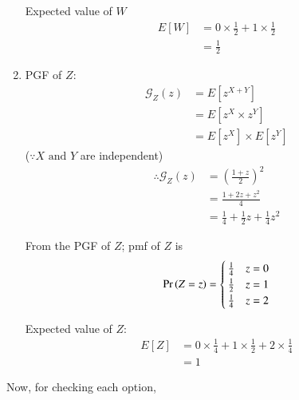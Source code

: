 \documentclass[journal,12pt,twocolumn]{IEEEtran}
\begin{document}
\begin{enumerate}
Expected value of $W$
\begin{align}
   E[W] &= 0\times\frac{1}{2} + 1\times\frac{1}{2}\\
                    &= \frac{1}{2} 
\end{align}

  \item PGF of $Z$:
\begin{align}
  \mathcal{G}_Z(z) &= E[z^{X+Y}]\\
                   &= E[z^X \times z^Y]\\
                   &= E[z^X]\times E[z^Y] 
\end{align}
($\because X \text{ and } Y$ are independent)
\begin{align}
 \therefore \mathcal{G}_Z(z) &=\left(\frac{1 + z}{2}\right)^2\\
                   &= \frac{1+2z+z^2}{4}\\
                   &= \frac{1}{4} + \frac{1}{2}z + \frac{1}{4}z^2
\end{align}

From the PGF of $Z$; \;pmf of $Z$ is
\begin{align}
    \Pr\left(Z = z\right) = 
\begin{cases}
\frac{1}{4} & z=0
\\
\frac{1}{2} & z=1\\
\frac{1}{4} & z=2
\end{cases}\label{2}
\end{align}

Expected value of $Z$:
\begin{align}
   E[Z] &= 0\times\frac{1}{4} + 1\times\frac{1}{2} + 2\times\frac{1}{4}\\
                     &= 1
\end{align}
\end{enumerate}
Now, for checking each option,
\end{document}
